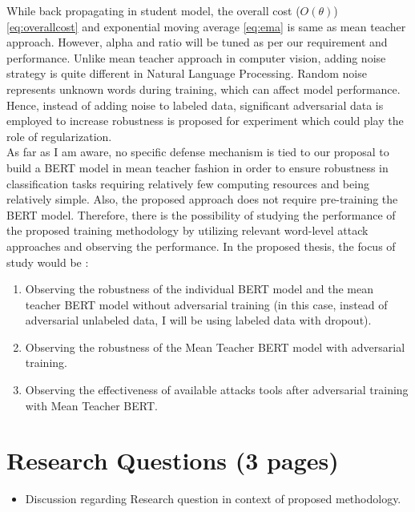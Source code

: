 \documentclass[%
	BCOR=8mm, %
	DIV=12, 
	toc=bibliography, %
	toc=listof, %
	oneside, %
	egregdoesnotlikesansseriftitles, %
	]{scrbook}
\begin{document}
While back propagating in student model, the overall cost ($\textit{O}(\theta)$) \ref{eq:overallcost}  and exponential moving average \ref{eq:ema} is same as mean teacher approach. 
However, alpha and ratio will be tuned as per our requirement and performance. 
Unlike mean teacher approach in computer vision, adding noise strategy is quite different in Natural Language Processing. Random noise represents unknown words during training, 
which can affect model performance. Hence, instead of adding noise to labeled data, significant adversarial data is employed to increase robustness is proposed for experiment which 
could play the role of regularization.\\
As far as I am aware, no specific defense mechanism is tied to our proposal to build a BERT model in mean teacher fashion in order to ensure robustness in classification tasks requiring 
relatively few computing resources and being relatively simple. Also, the proposed approach does not require pre-training the BERT model. Therefore, there is the possibility of studying 
the performance of the proposed training methodology by utilizing relevant word-level attack approaches and observing the performance.
In the proposed thesis, the focus of study would be :

\begin{enumerate}
\item Observing the robustness of the individual BERT model and the mean teacher BERT model without adversarial training (in this case, instead of adversarial unlabeled data, I will be using 
labeled data with dropout).
\item Observing the robustness of the Mean Teacher BERT model with adversarial training.
\item Observing the effectiveness of available attacks tools after adversarial training with Mean Teacher BERT.
\end{enumerate}
\section{Research Questions (3 pages)}
\begin{itemize}
\item Discussion regarding Research question in context of proposed methodology.
\end{itemize}

\end{document}

